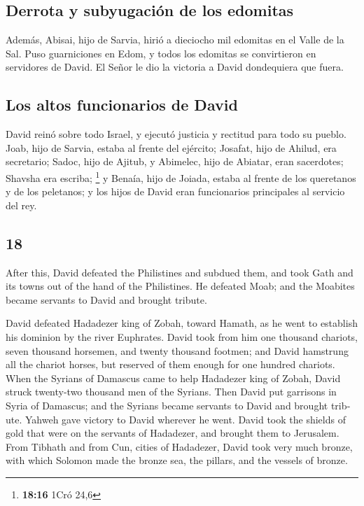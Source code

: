 \begin{paracol}{2}
\hypertarget{derrota-y-subyugaciuxf3n-de-los-edomitas}{%
\subsection{Derrota y subyugación de los
edomitas}\label{derrota-y-subyugaciuxf3n-de-los-edomitas}}

 Además, Abisai, hijo de Sarvia, hirió a dieciocho mil
edomitas en el Valle de la Sal.  Puso guarniciones en
Edom, y todos los edomitas se convirtieron en servidores de David. El
Señor le dio la victoria a David dondequiera que fuera.

\hypertarget{los-altos-funcionarios-de-david}{%
\subsection{Los altos funcionarios de
David}\label{los-altos-funcionarios-de-david}}

 David reinó sobre todo Israel, y ejecutó justicia y
rectitud para todo su pueblo.  Joab, hijo de Sarvia,
estaba al frente del ejército; Josafat, hijo de Ahilud, era secretario;
 Sadoc, hijo de Ajitub, y Abimelec, hijo de Abiatar, eran
sacerdotes; Shavsha era escriba; \footnote{\textbf{18:16} 1Cró 24,6}
 y Benaía, hijo de Joiada, estaba al frente de los
queretanos y de los peletanos; y los hijos de David eran funcionarios
principales al servicio del rey.

\switchcolumn
\begin{otherlanguage}{english}

\hypertarget{section-35}{%
\section{18}\label{section-35}}

 After this, David defeated the Philistines and subdued
them, and took Gath and its towns out of the hand of the Philistines.
 He defeated Moab; and the Moabites became servants to
David and brought tribute.

 David defeated Hadadezer king of Zobah, toward Hamath, as
he went to establish his dominion by the river Euphrates. 
David took from him one thousand chariots, seven thousand horsemen, and
twenty thousand footmen; and David hamstrung all the chariot horses, but
reserved of them enough for one hundred chariots.  When
the Syrians of Damascus came to help Hadadezer king of Zobah, David
struck twenty-two thousand men of the Syrians.  Then David
put garrisons in Syria of Damascus; and the Syrians became servants to
David and brought tribute. Yahweh gave victory to David wherever he
went.  David took the shields of gold that were on the
servants of Hadadezer, and brought them to Jerusalem. 
From Tibhath and from Cun, cities of Hadadezer, David took very much
bronze, with which Solomon made the bronze sea, the pillars, and the
vessels of bronze.


\end{otherlanguage}
\end{paracol}
